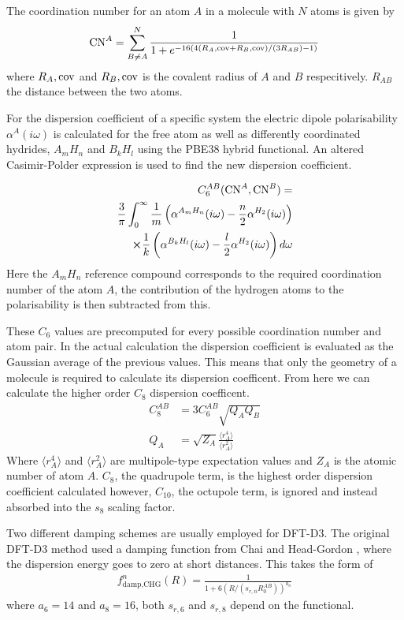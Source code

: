 \documentclass[10pt,a4paper,twocolumn,twoside]{extarticle}
\begin{document}
	The coordination number for an atom $A$ in a molecule with $N$ atoms is given by 
	{\small
	\begin{align}
		{\rm CN}^A = \sum_{B \neq A}^N \frac{1}{1 + e^{-16(4(R_A,{\rm cov} + R_B,{\rm cov})/(3R_{AB}) - 1)}}
	\end{align}}
	where $R_A,{\rm cov}$ and $R_B,{\rm cov}$ is the covalent radius of $A$ and $B$ respecitively. $R_{AB}$ the distance between the two atoms.

	For the dispersion coefficient of a specific system the electric dipole polarisability $\alpha^A (i\omega)$ is calculated for the free atom as well as differently coordinated hydrides, $A_mH_n$ and $B_kH_l$ using the PBE38 hybrid functional.\cite{Grimme2011} An altered Casimir-Polder expression is used to find the new dispersion coefficient. 

	\begin{align}
		C_6^{AB} ({\rm CN}^A , {\rm CN}^B) =  \nonumber \\ \frac{3}{\pi} \int^{\infty}_0 \frac{1}{m} \left(\alpha^{A_m H_n}(i\omega) - \frac{n}{2} \alpha^{H_2} (i\omega) \right) \nonumber \\ \cross \frac{1}{k} \left(\alpha^{B_k H_l}(i\omega) - \frac{l}{2} \alpha^{H_2} (i\omega)\right) d\omega 
	\end{align}
	Here the $A_mH_n$ reference compound corresponds to the required coordination number of the atom $A$, the contribution of the hydrogen atoms to the polarisability is then subtracted from this. 
	
	These $C_6$ values are precomputed for every possible coordination number and atom pair. In the actual calculation the dispersion coefficient is evaluated as the Gaussian average of the previous values. This means that only the geometry of a molecule is required to calculate its dispersion coefficent. From here we can calculate the higher order $C_8$ dispersion coefficent.
	\begin{align}
		C_8^{AB} &= 3C_6^{AB} \sqrt{Q_A Q_B}\\
		Q_A  &= \sqrt{Z_A} \frac{\langle r_A^4 \rangle}{\langle r_A^2 \rangle}
	\end{align}
	Where $\langle r_A^4 \rangle$ and $\langle r_A^2 \rangle$ are multipole-type expectation values and $Z_A$ is the atomic number of atom $A$. $C_8$, the quadrupole term, is the highest order dispersion coefficient calculated however, $C_{10}$, the octupole term, is ignored and instead absorbed into the $s_8$ scaling factor.

	Two different damping schemes are usually employed for DFT-D3. The original DFT-D3 method used a damping function from Chai and Head-Gordon \cite{Chai-Gordon-Damp}, where the dispersion energy goes to zero at short distances. 
	This takes the form of 
	\begin{align}
		f^n_\text{damp,CHG}(R) = \frac{1}{1 + 6(R/(s_{r,n}R_0^{AB}))^{a_n}} 
	\end{align}
	where $a_6 = 14$ and $a_8 = 16$, both $s_{r,6}$ and $s_{r,8}$ depend on the functional. 
	
\end{document}
